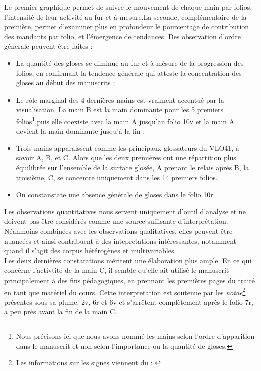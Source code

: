 \documentclass[a4paper, twoside, 12pt]{book}
\begin{document}
Le premier graphique permet de suivre le mouvement de chaque main par folios, l'intensité de leur activité au fur et à mesure.La seconde, complémentaire de la première, permet d'examiner plus en profondeur le pourcentage de contribution des mandants par folio, et l'émergence de tendances. Des observation d'ordre génerale peuvent être faites :

\begin{itemize}
    \item La quantité des gloses se diminue au fur et à mésure de la progression des folios, en confirmant la tendence générale qui atteste la concentration des gloses au début des manuscrits ;
    \item Le rôle marginal des 4 dernières mains est vraiment accentué par la visualisation. La main B est la main dominante pour les 5 premiers folios\footnote{Nous précisons ici que nous avons nommé les mains selon l'ordre d'apparition dans le manuscrit et non selon l'importance ou la quantité de gloses.},puis elle coexiste avec la main A jusqu'au folio 10v et la main A devient la main dominante jusqu'à la fin ;
    \item Trois mains apparaissent comme les principaux glossateurs du VLO41, à savoir A, B, et C. Alors que les deux premières ont une répartition plus équilibrée sur l'ensemble de la surface glosée, A prenant le relais après B, la troisième, C, se concentre uniquement dans les 14 premiers folios.
    \item On constanstate une absence générale de gloses dans le folio 10r.
\end{itemize}

Les observations quantitatives nous servent uniquement d'outil d'analyse et ne doivent pas être considérés comme une source suffisante d'interprétation. Néanmoins combinées avec les observations qualitatives, elles peuvent être nuancées et ainsi contribuent à des intepretations intéressantes, notamment quand il s'agit des corpus hétérogènes et multivariables. \\

Les deux dernières constatations méritent une élaboration plus ample. En ce qui concèrne l'activtité de la main C, il semble qu'elle ait utilisé le manuscrit principalement à des fins pédagogiques, en prennant les premières pages du traité en tant que matériel du cours. Cette interpretation est soutenue par les \textit{notae}\footnote{Les informations sur les signes viennent du : \cite{steinova2016notam}} présentes sous sa plume. 2v, 6r et 6v et s'arrêtent complètement après le folio 7r, a peu près avant la fin de la main C.
\end{document}
